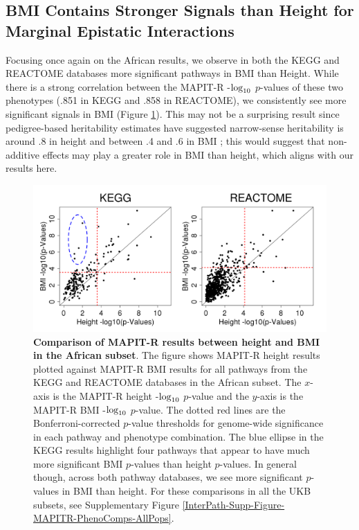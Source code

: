 \documentclass[12pt,a4paper]{article}
\def\log{{\rm log}}
\begin{document}
\subsection{BMI Contains Stronger Signals than Height for Marginal Epistatic Interactions}

Focusing once again on the African results, we observe in both the KEGG and REACTOME databases more significant pathways in BMI than Height. While there is a strong correlation between the MAPIT-R -$\log_{10}$ $p$-values of these two phenotypes (.851 in KEGG and .858 in REACTOME), we consistently see more significant signals in BMI (Figure \ref{InterPath-Main-Figure-MAPITR-PhenoComps-African}). This may not be a surprising result since pedigree-based heritability estimates have suggested narrow-sense heritability is around .8 in height and between .4 and .6 in BMI \citep{Elks2012,Visscher2012}; this would suggest that non-additive effects may play a greater role in BMI than height, which aligns with our results here. 

\begin{figure}[htb]
\centering
\includegraphics[scale=.45]{Images/Main/InterPath_Main_Figure_MAPITR_PhenoComps_African_vs3.png}
\caption[TBD]{\textbf{Comparison of MAPIT-R results between height and BMI in the African subset}. The figure shows MAPIT-R height results plotted against MAPIT-R BMI results for all pathways from the KEGG and REACTOME databases in the African subset. The $x$-axis is the MAPIT-R height -$\log_{10}$ $p$-value and the $y$-axis is the MAPIT-R BMI -$\log_{10}$ $p$-value. The dotted red lines are the Bonferroni-corrected $p$-value thresholds for genome-wide significance in each pathway and phenotype combination. The blue ellipse in the KEGG results highlight four pathways that appear to have much more significant BMI $p$-values than height $p$-values. In general though, across both pathway databases, we see more significant $p$-values in BMI than height. For these comparisons in all the UKB subsets, see Supplementary Figure \ref{InterPath-Supp-Figure-MAPITR-PhenoComps-AllPops}.}
\label{InterPath-Main-Figure-MAPITR-PhenoComps-African}
\end{figure}
\end{document}
